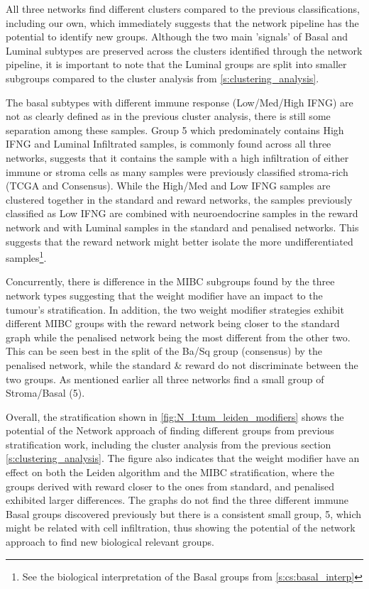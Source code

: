All three networks find different clusters compared to the previous classifications, including our own, which immediately suggests that the network pipeline has the potential to identify new groups. Although the two main 'signals' of Basal and Luminal subtypes are preserved across the clusters identified through the network pipeline, it is important to note that the Luminal groups are split into smaller subgroups compared to the cluster analysis from \cref{s:clustering_analysis}. 

The basal subtypes with different immune response (Low/Med/High IFNG) are not as clearly defined as in the previous cluster analysis, there is still some separation among these samples. Group 5 which predominately contains High IFNG and Luminal Infiltrated samples, is commonly found across all three networks, suggests that it contains the sample with a high infiltration of either immune or stroma cells as many samples were previously classified stroma-rich (TCGA and Consensus). While the High/Med and Low IFNG samples are clustered together in the standard and reward networks, the samples previously classified as Low IFNG are combined with neuroendocrine samples in the reward network and with Luminal samples in the standard and penalised networks. This suggests that the reward network might better isolate the more undifferentiated samples\footnote{See the biological interpretation of the Basal groups from \cref{s:cs:basal_interp}}.

Concurrently, there is difference in the MIBC subgroups found by the three network types suggesting that the weight modifier have an impact to the tumour's stratification. In addition, the two weight modifier strategies exhibit different MIBC groups with the reward network being closer to the standard graph while the penalised network being the most different from the other two. This can be seen best in the split of the Ba/Sq group (consensus) by the penalised network, while the standard \& reward do not discriminate between the two groups. As mentioned earlier all three networks find a small group of Stroma/Basal (5).

Overall, the stratification shown in \cref{fig:N_I:tum_leiden_modifiers} shows the potential of the Network approach of finding different groups from previous stratification work, including the cluster analysis from the previous section \cref{s:clustering_analysis}. The figure also indicates that the weight modifier have an effect on both the Leiden algorithm and the MIBC stratification, where the groups derived with reward closer to the ones from standard, and penalised exhibited larger differences. The graphs do not find the three different immune Basal groups discovered previously but there is a consistent small group, 5, which might be related with cell infiltration, thus showing the potential of the network approach to find new biological relevant groups.


